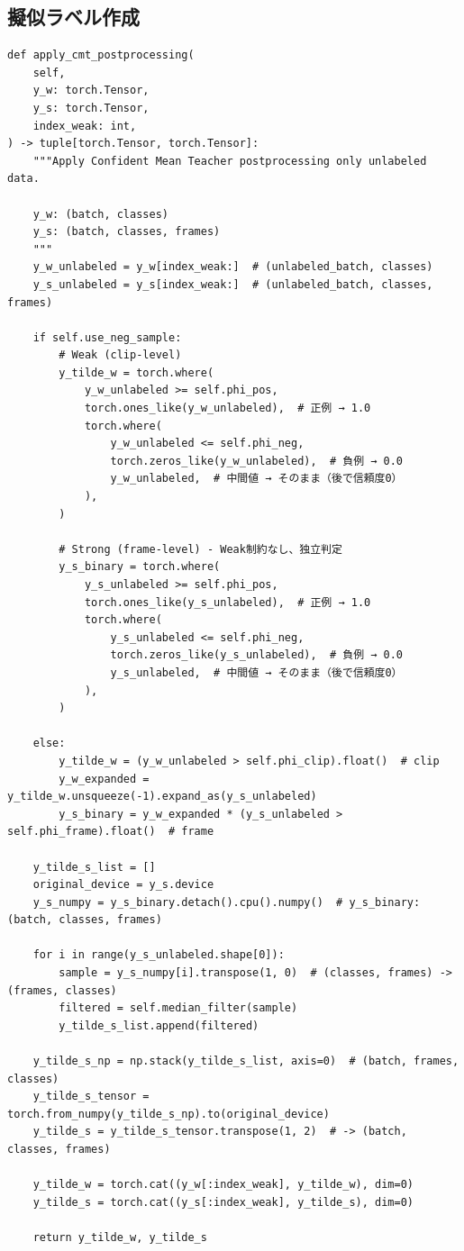 \documentclass[../main.tex]{subfiles}
\begin{document}
\subsection{擬似ラベル作成}
\begin{verbatim}
def apply_cmt_postprocessing(
    self,
    y_w: torch.Tensor,
    y_s: torch.Tensor,
    index_weak: int,
) -> tuple[torch.Tensor, torch.Tensor]:
    """Apply Confident Mean Teacher postprocessing only unlabeled data.

    y_w: (batch, classes)
    y_s: (batch, classes, frames)
    """
    y_w_unlabeled = y_w[index_weak:]  # (unlabeled_batch, classes)
    y_s_unlabeled = y_s[index_weak:]  # (unlabeled_batch, classes, frames)

    if self.use_neg_sample:
        # Weak (clip-level)
        y_tilde_w = torch.where(
            y_w_unlabeled >= self.phi_pos,
            torch.ones_like(y_w_unlabeled),  # 正例 → 1.0
            torch.where(
                y_w_unlabeled <= self.phi_neg,
                torch.zeros_like(y_w_unlabeled),  # 負例 → 0.0
                y_w_unlabeled,  # 中間値 → そのまま（後で信頼度0）
            ),
        )

        # Strong (frame-level) - Weak制約なし、独立判定
        y_s_binary = torch.where(
            y_s_unlabeled >= self.phi_pos,
            torch.ones_like(y_s_unlabeled),  # 正例 → 1.0
            torch.where(
                y_s_unlabeled <= self.phi_neg,
                torch.zeros_like(y_s_unlabeled),  # 負例 → 0.0
                y_s_unlabeled,  # 中間値 → そのまま（後で信頼度0）
            ),
        )

    else:
        y_tilde_w = (y_w_unlabeled > self.phi_clip).float()  # clip
        y_w_expanded = y_tilde_w.unsqueeze(-1).expand_as(y_s_unlabeled)
        y_s_binary = y_w_expanded * (y_s_unlabeled > self.phi_frame).float()  # frame

    y_tilde_s_list = []
    original_device = y_s.device
    y_s_numpy = y_s_binary.detach().cpu().numpy()  # y_s_binary: (batch, classes, frames)

    for i in range(y_s_unlabeled.shape[0]):
        sample = y_s_numpy[i].transpose(1, 0)  # (classes, frames) -> (frames, classes)
        filtered = self.median_filter(sample)
        y_tilde_s_list.append(filtered)

    y_tilde_s_np = np.stack(y_tilde_s_list, axis=0)  # (batch, frames, classes)
    y_tilde_s_tensor = torch.from_numpy(y_tilde_s_np).to(original_device)
    y_tilde_s = y_tilde_s_tensor.transpose(1, 2)  # -> (batch, classes, frames)

    y_tilde_w = torch.cat((y_w[:index_weak], y_tilde_w), dim=0)
    y_tilde_s = torch.cat((y_s[:index_weak], y_tilde_s), dim=0)

    return y_tilde_w, y_tilde_s
\end{verbatim}
\end{document}
